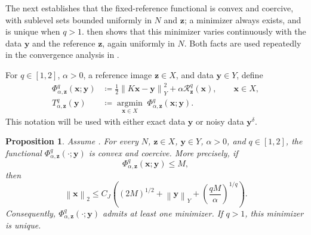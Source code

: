 \documentclass{article}
\newtheorem{proposition}[theorem]{Proposition}
\theoremstyle{remark}
\newcommand{\norm}[1]{\left\lVert #1 \right\rVert}
\newcommand{\Rreg}{\mathcal{R}}
\newcommand{\bx}{{\bm{x}}}
\newcommand{\by}{{\bm{y}}}
\newcommand{\bz}{{\bm{z}}}
\begin{document}
The next  establishes that the fixed-reference functional is convex
and coercive, with sublevel sets bounded uniformly in $N$ and $\bz$; a minimizer
always exists, and is unique when $q>1$.  then shows
that this minimizer varies continuously with the data $\by$ and the reference
$\bz$, again uniformly in $N$. Both facts are used repeatedly in the convergence
analysis in .

For $q\in[1,2]$, $\alpha>0$, a reference image $\bz\in X$, and data $\by\in Y$,
define
\begin{subequations}\label{eq:fixed-graph-functional}
\begin{align}
\Phi_{\alpha,\bz}^q(\bx;\by)
&\coloneqq\frac12\norm{K\bx-\by}_Y^2+\alpha\Rreg_\bz^q(\bx),
\qquad \bx\in X ,
\label{eq:fixed-graph-functional-a}\\[6pt]
T^q_{\alpha,\bz}(\by)
&\coloneqq\operatorname*{argmin}_{\bx\in X}\;\Phi_{\alpha,\bz}^q(\bx;\by).
\label{eq:fixed-graph-functional-b}
\end{align}
\end{subequations}
This notation will be used with either exact data $\by$ or noisy data
$\by^\delta$.

\begin{proposition}\label{prop:existence}
Assume . For every $N$, $\bz\in X$,
$\by\in Y$, $\alpha>0$, and $q\in[1,2]$, the functional
$\Phi_{\alpha,\bz}^q(\cdot;\by)$ is convex and coercive. More precisely, if
\[
\Phi_{\alpha,\bz}^q(\bx;\by)\le M,
\]
then
\begin{equation}\label{eq:sublevel-bound}
\norm{\bx}_2
\le C_J\left((2M)^{1/2}+\norm{\by}_Y
+\left(\frac{qM}{\alpha}\right)^{1/q}\right).
\end{equation}
Consequently, $\Phi_{\alpha,\bz}^q(\cdot;\by)$ admits at least one minimizer.
If $q>1$, this minimizer is unique.
\end{proposition}
\end{document}
